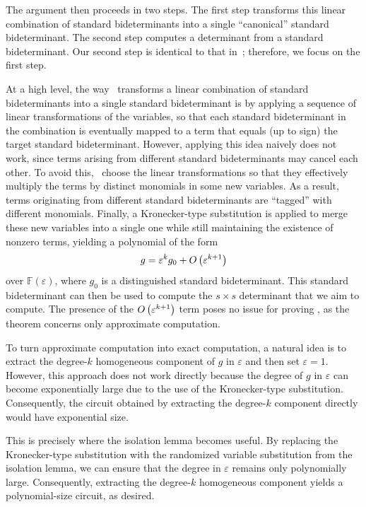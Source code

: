 \documentclass[10pt,a4paper]{amsart}
\newcommand*\F{\mathbb{F}}
\newcommand*\e{\varepsilon}
\newcommand*\bigO[1]{%
    O\kern-0.0pt\left(#1\right)
}
\begin{document}
The argument then proceeds in two steps.
The first step transforms this linear combination of standard bideterminants into a single ``canonical'' standard bideterminant.
The second step computes a determinant from a standard bideterminant.
Our second step is identical to that in~\cite{AF21}; therefore, we focus on the first step.

At a high level, the way~\cite{AF21} transforms a linear combination of standard bideterminants into a single standard bideterminant is by applying a sequence of linear transformations of the variables, so that each standard bideterminant in the combination is eventually mapped to a term that equals (up to sign) the target standard bideterminant.
However, applying this idea naively does not work, since terms arising from different standard bideterminants may cancel each other.
To avoid this,~\cite{AF21} choose the linear transformations so that they effectively multiply the terms by distinct monomials in some new variables.
As a result, terms originating from different standard bideterminants are ``tagged'' with different monomials.
Finally, a Kronecker-type substitution is applied to merge these new variables into a single one while still maintaining the existence of nonzero terms, yielding a polynomial of the form 
\[
    g = \e^k g_0 + \bigO{\e^{k+1}}
\]
over $\F(\e)$, where $g_0$ is a distinguished standard bideterminant. 
This standard bideterminant can then be used to compute the $s \times s$ determinant that we aim to compute.
The presence of the $\bigO{\e^{k+1}}$ term poses no issue for proving , as the theorem concerns only approximate computation.

To turn approximate computation into exact computation, a natural idea is to extract the degree-$k$ homogeneous component of $g$ in $\e$ and then set $\e = 1$.
However, this approach does not work directly because the degree of $g$ in $\e$ can become exponentially large due to the use of the Kronecker-type substitution.
Consequently, the circuit obtained by extracting the degree-$k$ component directly would have exponential size.

This is precisely where the isolation lemma becomes useful.
By replacing the Kronecker-type substitution with the randomized variable substitution from the isolation lemma, we can ensure that the degree in $\e$ remains only polynomially large.
Consequently, extracting the degree-$k$ homogeneous component yields a polynomial-size circuit, as desired.
\end{document}
